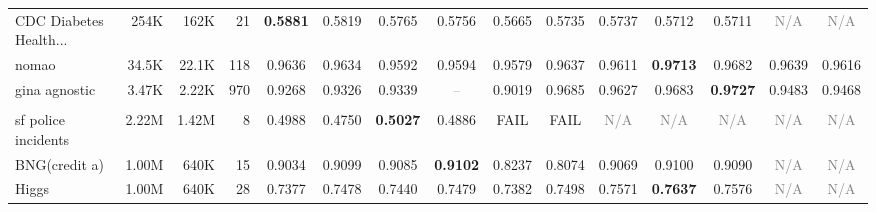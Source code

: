 \begin{table}[t]
{\begin{tabular}{lrrrccccccccccc}
CDC Diabetes Health... & 254K & 162K & 21 & \cellcolor[HTML]{D9EAD3}\textbf{0.5881} & \cellcolor[HTML]{EFEFCF}0.5819 & \cellcolor[HTML]{FEEFCC}0.5765 & \cellcolor[HTML]{FDECCC}0.5756 & \cellcolor[HTML]{F4CCCC}0.5665 & \cellcolor[HTML]{FBE5CC}0.5735 & \cellcolor[HTML]{FBE5CC}0.5737 & \cellcolor[HTML]{F9DDCC}0.5712 & \cellcolor[HTML]{F9DCCC}0.5711 & \textcolor{gray}{N/A} & \textcolor{gray}{N/A} \\
nomao & 34.5K & 22.1K & 118 & \cellcolor[HTML]{FDECCC}0.9636 & \cellcolor[HTML]{FDEBCC}0.9634 & \cellcolor[HTML]{F6D3CC}0.9592 & \cellcolor[HTML]{F6D5CC}0.9594 & \cellcolor[HTML]{F4CCCC}0.9579 & \cellcolor[HTML]{FEEDCC}0.9637 & \cellcolor[HTML]{F9DECC}0.9611 & \cellcolor[HTML]{D9EAD3}\textbf{0.9713} & \cellcolor[HTML]{EBEED0}0.9682 & \cellcolor[HTML]{FEEECC}0.9639 & \cellcolor[HTML]{FAE1CC}0.9616 \\
gina agnostic & 3.47K & 2.22K & 970 & \cellcolor[HTML]{FCE7CC}0.9268 & \cellcolor[HTML]{FEEDCC}0.9326 & \cellcolor[HTML]{FEEECC}0.9339 & \textcolor{gray}{--} & \cellcolor[HTML]{F4CCCC}0.9019 & \cellcolor[HTML]{DEEBD2}0.9685 & \cellcolor[HTML]{E4ECD1}0.9627 & \cellcolor[HTML]{DEEBD2}0.9683 & \cellcolor[HTML]{D9EAD3}\textbf{0.9727} & \cellcolor[HTML]{F3F0CE}0.9483 & \cellcolor[HTML]{F5F0CE}0.9468 \\
\addlinespace[2pt]
\rowcolor{gray!15}
\multicolumn{15}{l}{\textbf{Macro F1}} \\
sf police incidents & 2.22M & 1.42M & 8 & \cellcolor[HTML]{E4ECD1}0.4988 & \cellcolor[HTML]{F4CCCC}0.4750 & \cellcolor[HTML]{D9EAD3}\textbf{0.5027} & \cellcolor[HTML]{FFF1CC}0.4886 & \textcolor{red!70!black}{FAIL} & \textcolor{red!70!black}{FAIL} & \textcolor{gray}{N/A} & \textcolor{gray}{N/A} & \textcolor{gray}{N/A} & \textcolor{gray}{N/A} & \textcolor{gray}{N/A} \\
BNG(credit a) & 1.00M & 640K & 15 & \cellcolor[HTML]{DEEBD2}0.9034 & \cellcolor[HTML]{D9EAD3}0.9099 & \cellcolor[HTML]{DAEAD3}0.9085 & \cellcolor[HTML]{D9EAD3}\textbf{0.9102} & \cellcolor[HTML]{F7D8CC}0.8237 & \cellcolor[HTML]{F4CCCC}0.8074 & \cellcolor[HTML]{DBEBD3}0.9069 & \cellcolor[HTML]{D9EAD3}0.9100 & \cellcolor[HTML]{DAEAD3}0.9090 & \textcolor{gray}{N/A} & \textcolor{gray}{N/A} \\
Higgs & 1.00M & 640K & 28 & \cellcolor[HTML]{F4CCCC}0.7377 & \cellcolor[HTML]{FDEACC}0.7478 & \cellcolor[HTML]{F9DECC}0.7440 & \cellcolor[HTML]{FDEACC}0.7479 & \cellcolor[HTML]{F4CDCC}0.7382 & \cellcolor[HTML]{FEEFCC}0.7498 & \cellcolor[HTML]{ECEECF}0.7571 & \cellcolor[HTML]{D9EAD3}\textbf{0.7637} & \cellcolor[HTML]{EBEED0}0.7576 & \textcolor{gray}{N/A} & \textcolor{gray}{N/A} \\

\end{tabular}}
\end{table}
